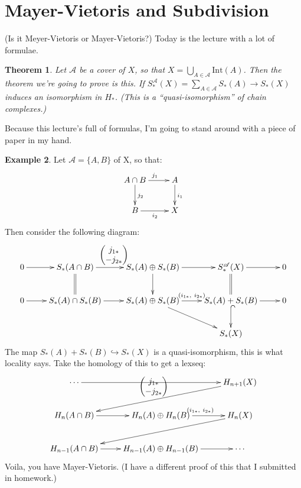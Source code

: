 \documentclass{amsart}
\theoremstyle{theorem}
\newtheorem{theorem}{Theorem}[section]
\theoremstyle{definition}
\newtheorem{example}[theorem]{Example}
\newcommand{\sca}{\mathscr{A}}
\begin{document}
\section{Mayer-Vietoris and Subdivision}
(Is it Meyer-Vietoris or Mayer-Vietoris?) Today is the lecture with a lot of formulae.
\begin{theorem}
Let $\sca$ be a cover of $X$, so that $X=\bigcup_{A\in \sca}\mathrm{Int}(A)$. Then the theorem we're going to prove is this. If $S^\sca_\ast(X)=\sum_{A\in\sca}S_\ast(A)\to S_\ast(X)$ induces an isomorphism in $ H_\ast$. (This is a ``quasi-isomorphism'' of chain complexes.)
\end{theorem}
Because this lecture's full of formulas, I'm going to stand around with a piece of paper in my hand.
\begin{example}
Let $\sca=\{A,B\}$ of X, so that:
\begin{equation*}
\xymatrix{A\cap B\ar[r]^{j_1}\ar[d]^{j_2} & A\ar[d]^{i_1}\\
B\ar[r]_{i_2} & X}
\end{equation*}
Then consider the following diagram:
\begin{equation*}
\xymatrix{0\ar[r] & S_\ast(A\cap B)\ar[r]^{\begin{pmatrix}j_{1\ast} \\ -j_{2\ast}\end{pmatrix}}\ar@{=}[d] & S_\ast(A)\oplus S_\ast(B)\ar[r]\ar[d] & S^\sca_\ast(X)\ar[r]\ar@{=}[d] & 0\\
0\ar[r] & S_\ast(A)\cap S_\ast(B)\ar[r] & S_\ast(A)\oplus S_\ast(B)\ar[dr]\ar[r]^{(i_{1\ast},\ i_{2\ast})} & S_\ast(A)+S_\ast(B)\ar[r]\ar@{^(->}[d] & 0\\
 & & & S_\ast(X) &}
\end{equation*}
The map $S_\ast(A)+S_\ast(B)\hookrightarrow S_\ast(X)$ is a quasi-isomorphism, this is what locality says. Take the homology of this to get a lexseq:
\begin{equation*}
\xymatrix{ \cdots\ar[rr] & & H_{n+1}(X)\ar[dll]_{\begin{pmatrix}j_{1\ast} \\ -j_{2\ast}\end{pmatrix}}\\
 H_n(A\cap B)\ar[r] & H_n(A)\oplus H_n(B)\ar[r]^{(i_{1\ast},\ i_{2\ast})} & H_n(X)\ar[dll]\\
 H_{n-1}(A\cap B)\ar[r] & H_{n-1}(A)\oplus H_{n-1}(B)\ar[r] & \cdots}
\end{equation*}
Voila, you have Mayer-Vietoris. (I have a different proof of this that I submitted in homework.)
\end{example}
\end{document}
